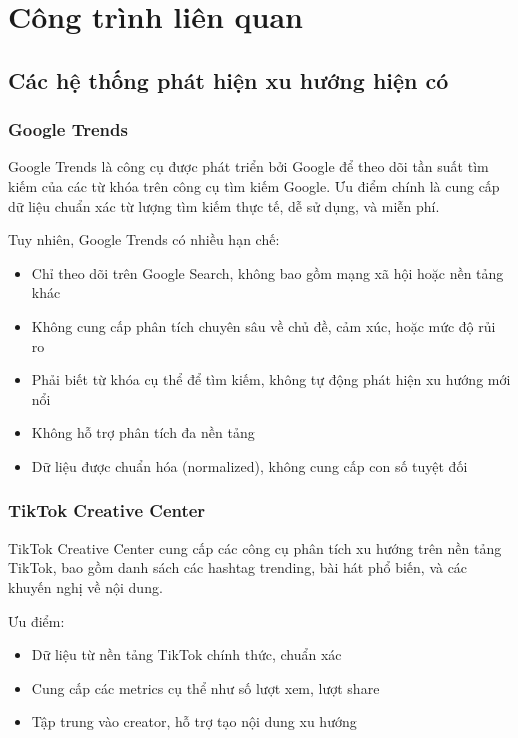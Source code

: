 
\chapter{Công trình liên quan}


\section{Các hệ thống phát hiện xu hướng hiện có}

\subsection{Google Trends}

Google Trends là công cụ được phát triển bởi Google để theo dõi tần suất tìm kiếm của các từ khóa trên công cụ tìm kiếm Google. Ưu điểm chính là cung cấp dữ liệu chuẩn xác từ lượng tìm kiếm thực tế, dễ sử dụng, và miễn phí.

Tuy nhiên, Google Trends có nhiều hạn chế:
\begin{itemize}
    \item Chỉ theo dõi trên Google Search, không bao gồm mạng xã hội hoặc nền tảng khác
    \item Không cung cấp phân tích chuyên sâu về chủ đề, cảm xúc, hoặc mức độ rủi ro
    \item Phải biết từ khóa cụ thể để tìm kiếm, không tự động phát hiện xu hướng mới nổi
    \item Không hỗ trợ phân tích đa nền tảng
    \item Dữ liệu được chuẩn hóa (normalized), không cung cấp con số tuyệt đối
\end{itemize}

\subsection{TikTok Creative Center}

TikTok Creative Center cung cấp các công cụ phân tích xu hướng trên nền tảng TikTok, bao gồm danh sách các hashtag trending, bài hát phổ biến, và các khuyến nghị về nội dung.

Ưu điểm:
\begin{itemize}
    \item Dữ liệu từ nền tảng TikTok chính thức, chuẩn xác
    \item Cung cấp các metrics cụ thể như số lượt xem, lượt share
    \item Tập trung vào creator, hỗ trợ tạo nội dung xu hướng
\end{itemize}

